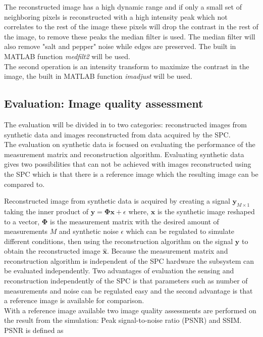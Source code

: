 The reconstructed image has a high dynamic range and if only a small set of neighboring pixels is reconstructed with a high intensity peak which not correlates to the rest of the image these pixels will drop the contrast in the rest of the image, to remove these peaks the median filter is used. The median filter will also remove "salt and pepper" noise while edges are preserved. The built in MATLAB function \textit{medfilt2} will be used.\\[0.1in]

The second operation is an intensity transform to maximize the contrast in the image, the built in MATLAB function \textit{imadjust} will be used.   


\subsection{Evaluation: Image quality assessment}
The evaluation will be divided in to two categories: reconstructed images from synthetic data and images reconstructed from data acquired by the SPC.\\[0.1in] 

The evaluation on synthetic data is focused on evaluating the performance of the measurement matrix and reconstruction algorithm. Evaluating synthetic data gives two possibilities that can not be achieved with images reconstructed using the SPC which is that there is a reference image which the resulting image can be compared to.

Reconstructed image from synthetic data is acquired by creating a signal $ \mathbf{ y }_{M\times1}$ taking the inner product of $ \mathbf{y} = \mathbf{\Phi} \mathbf{x} + \epsilon$ where, $\mathbf{x}$ is the synthetic image reshaped to a vector, $\mathbf{\Phi}$ is the measurement matrix with the desired amount of measurements $M$ and synthetic noise $\epsilon$ which can be regulated to simulate different conditions, then using the reconstruction algorithm on the signal $\mathbf{y}$ to obtain the reconstructed image $\mathbf{\hat x}$. Because the measurement matrix and reconstruction algorithm is independent of the SPC hardware the subsystem can be evaluated independently. Two advantages of evaluation the sensing and reconstruction independently of the SPC is that parameters such as number of measurements and noise can be regulated easy and the second advantage is that a reference image is available for comparison.\\[0.1in] 

With a reference image available two image quality assessments are performed on the result from the simulation: Peak signal-to-noise ratio (PSNR) and  SSIM. PSNR is defined as

